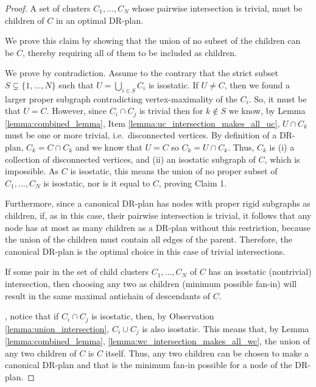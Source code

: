 \begin{proof}
\medskip\noindent
{}
%
A set of clusters $C_1,\ldots,C_N$ whose pairwise intersection is trivial, must be children of $C$ in an optimal DR-plan.

We prove this claim  by showing that the union of no subset of the children can be $C$, thereby requiring all of them to be included as children.



We prove by contradiction.
Assume to the contrary that the strict subset $S\subsetneq \{1,\ldots,N\}$ such that $U=\bigcup_{i\in S}{C_i}$ is isostatic. If $U\neq C$, then we found a larger proper subgraph contradicting vertex-maximality of the $C_i$. So, it must be that $U=C$.
\usestwod
However, since $C_i \cap C_j$ is trivial then for $k\notin S$ we know, by Lemma \ref{lemma:combined_lemma}, Item \ref{lemma:uc_intersection_makes_all_uc}, $U\cap C_k$ must be one or more trivial, i.e.\ disconnected vertices. By definition of a DR-plan, $C_k=C\cap C_k$ and we know that $U=C$ so $C_k=U\cap C_k$. Thus, $C_k$ is (i) a collection of disconnected vertices, and (ii) an isostatic subgraph of $C$, which is impossible. As $C$ is isostatic, this means the union of no proper subset of $C_1,\ldots,C_N$ is isostatic, nor is it equal to $C$, proving Claim 1.

Furthermore, since a canonical DR-plan has nodes with proper rigid  subgraphs as children, if, as in this case, their pairwise intersection is trivial, it follows that any node has at most as many children as a DR-plan without this restriction, because the union of the children must contain all edges of the parent. Therefore, the canonical DR-plan is the optimal choice in this case of trivial intersections.

\medskip\noindent
{}
If some pair in the set of child clusters $C_1,\ldots,C_N$ of $C$ has an isostatic (nontrivial) intersection, then choosing any two as children (minimum possible fan-in) will result in the same maximal antichain of descendants of $C$.

, notice that if  $C_i \cap C_j$ is isostatic, then, by Observation \ref{lemma:union_intersection}, $C_i \cup C_j$ is also isostatic. This means that, by Lemma \ref{lemma:combined_lemma},  \ref{lemma:wc_intersection_makes_all_wc}, the union of any two children of $C$ is $C$ itself. Thus, any two children can be chosen to make a canonical DR-plan and that is the minimum fan-in possible for a node of the DR-plan.


\end{proof}
